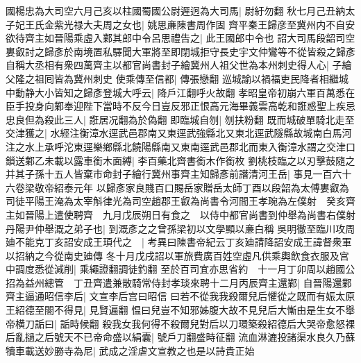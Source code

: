 國楊忠為大司空六月己亥以柱國蜀國公尉遲迥為大司馬|{
	尉紆勿翻}
秋七月己丑納太子妃王氏金紫光禄大夫周之女也|{
	姚思亷陳書周作固}
齊平秦王歸彦至冀州内不自安欲待齊主如晉陽乘虛入鄴其郎中令呂思禮告之|{
	此王國郎中令也}
詔大司馬段韶司空婁叡討之歸彥於南境置私驛聞大軍將至即閉城拒守長史宇文仲鸞等不從皆殺之歸彥自稱大丞相有衆四萬齊主以都官尚書封子繪冀州人祖父世為本州刺史得人心|{
	子繪父隆之祖囘皆為冀州刺史}
使乘傳至信都|{
	傳張戀翻}
巡城諭以禍福吏民降者相繼城中動静大小皆知之歸彥登城大呼云|{
	降戶江翻呼火故翻}
孝昭皇帝初崩六軍百萬悉在臣手投身向鄴奉迎陛下當時不反今日豈反邪正恨高元海畢義雲高乾和誑惑聖上疾忌忠良但為殺此三人|{
	誑居况翻為於偽翻}
即臨城自刎|{
	刎扶粉翻}
既而城破單騎北走至交津獲之|{
	水經注衡漳水逕武邑郡南又東逕武強縣北又東北逕武隧縣故城南白馬河注之水上承呼沱東逕樂鄉縣北饒陽縣南又東南逕武邑郡北而東入衡漳水謂之交津口}
鎻送鄴乙未載以露車銜木面縛|{
	李百藥北齊書銜木作銜枚}
劉桃枝臨之以刃擊鼓隨之并其子孫十五人皆棄市命封子繪行冀州事齊主知歸彥前譖清河王岳|{
	事見一百六十六卷梁敬帝紹泰元年}
以歸彥家良賤百口賜岳家贈岳太師丁酉以段韶為太傅婁叡為司徒平陽王淹為太宰斛律光為司空趙郡王叡為尚書令河間王孝琬為左僕射　癸亥齊主如晉陽上遣使聘齊　九月戊辰朔日有食之　以侍中都官尚書到仲舉為尚書右僕射丹陽尹仲舉溉之弟子也|{
	到溉彥之之曾孫梁初以文學顯以亷白稱}
吳明徹至臨川攻周廸不能克丁亥詔安成王頊代之　|{
	考異曰陳書帝紀云丁亥廸請降詔安成王諱督衆軍以招納之今從南史廸傳}
冬十月戊戌詔以軍旅費廣百姓空虛凡供乘輿飲食衣服及宫中調度悉從減削|{
	乘繩證翻調徒釣翻}
至於百司宜亦思省約　十一月丁卯周以趙國公招為益州總管　丁丑齊遣兼散騎常侍封孝琰來聘十二月丙辰齊主還鄴|{
	自晉陽還鄴}
齊主逼通昭信李后|{
	文宣李后宫曰昭信}
曰若不從我我殺爾兒后懼從之既而有娠太原王紹德至閤不得見|{
	見賢遍翻}
愠曰兒豈不知邪姊腹大故不見兒后大慚由是生女不舉帝横刀詬曰|{
	詬時候翻}
殺我女我何得不殺爾兒對后以刀環築殺紹德后大哭帝愈怒裸后亂撾之后號天不已帝命盛以絹囊|{
	號戶刀翻盛時征翻}
流血淋漉投諸渠水良久乃蘇犢車載送妙勝寺為尼|{
	武成之淫虐文宣教之也是以詩貴正始}


